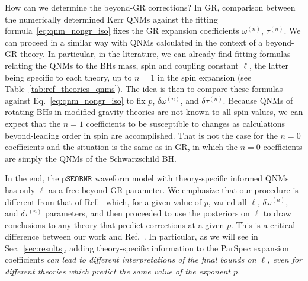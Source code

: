\documentclass[twocolumn,
               prd,
               aps,
               superscriptaddress,
               tightenlines,
               nofootinbib,
               eqsecnum,
               amsfonts,
               amsmath,
               longbibliography]{revtex4-1}
\newcommand{\pSEOB}{\texttt{pSEOBNR}}
\begin{document}
How can we determine the beyond-GR corrections? In GR, comparison between the numerically determined
Kerr QNMs against the fitting formula~\eqref{eq:qnm_nongr_iso} fixes the GR expansion coefficients
$\omega^{(n)}$, $\tau^{(n)}$.
%
We can proceed in a similar way with QNMs calculated in the context of a beyond-GR theory.
%
In particular, in the literature, we can already find fitting formulas relating
the QNMs to the BHs mass, spin and coupling constant $\ell$, the latter being
specific to each theory, up to $n=1$ in the spin expansion (see Table~\ref{tab:ref_theories_qnms}).
%
The idea is then to compare these formulas against Eq.~\eqref{eq:qnm_nongr_iso}
to fix $p$, $\delta\omega^{(n)}$, and $\delta\tau^{(n)}$.
%
Because QNMs of rotating BHs in modified gravity theories are not known to
all spin values, we can expect that the $n=1$ coefficients to be susceptible to
changes as calculations beyond-leading order in spin are accomplished.
%
That is not the case for the $n=0$ coefficients and the situation is the same as in GR,
in which the $n=0$ coefficients are simply the QNMs of the Schwarzschild BH.

In the end, the $\pSEOB$ waveform model with theory-specific informed
QNMs has only $\ell$ as a free beyond-GR parameter.
%
We emphasize that our procedure is different from that of
Ref.~\cite{Carullo:2021dui} which, for a given value of $p$, varied all $\ell$,
$\delta\omega^{(n)}$, and $\delta\tau^{(n)}$ parameters, and then proceeded
to use the posteriors on $\ell$ to draw conclusions to any theory that predict
corrections at a given $p$.
%
This is a critical difference between our work and Ref.~\cite{Carullo:2021dui}.
In particular, as we will see in Sec.~\ref{sec:results}, adding theory-specific
information to the ParSpec expansion coefficients \emph{can lead to different interpretations
of the final bounds on $\ell$, even for different theories which predict the same value of the exponent $p$.}
\end{document}
